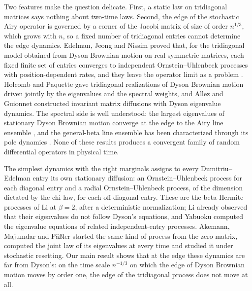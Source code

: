 \documentclass[11pt]{amsart}
\theoremstyle{remark}
\begin{document}
Two features make the question delicate. First, a static law on tridiagonal matrices says nothing about two-time laws.
Second, the edge of the stochastic Airy operator is governed by a corner of the Jacobi matrix of size of order
$n^{1/3}$, which grows with $n$, so a fixed number of tridiagonal entries cannot determine the edge dynamics.
Edelman, Jeong and Nissim \cite[Theorem~3.1]{EJN24} proved that, for the tridiagonal model obtained from Dyson Brownian
motion on real symmetric matrices, each fixed finite set of entries converges to independent Ornstein--Uhlenbeck
processes with position-dependent rates, and they leave the operator limit as a problem \cite[Problem~4]{EJN24}.
Holcomb and Paquette \cite{HP17} gave tridiagonal realizations of Dyson Brownian motion driven jointly by the
eigenvalues and the spectral weights, and Allez and Guionnet \cite{AG13} constructed invariant matrix diffusions with
Dyson eigenvalue dynamics. The spectral side is well understood: the largest eigenvalues of stationary Dyson Brownian motion
converge at the edge to the Airy line ensemble \cite{CH14,Lan20,GXZ24}, and the general-beta line ensemble has been
characterized through its pole dynamics \cite{HZ26}. None of these results produces a convergent family of random
differential operators in physical time.

The simplest dynamics with the right marginals assigns to every Dumitriu--Edelman entry its own stationary diffusion:
an Ornstein--Uhlenbeck process for each diagonal entry and a radial Ornstein--Uhlenbeck process, of the dimension
dictated by the chi law, for each off-diagonal entry. These are the beta-Hermite processes of Li \cite{Li10} at
$\beta=2$, after a deterministic normalization; Li already observed that their eigenvalues do not follow Dyson's
equations, and Yabuoku \cite{Yab23} computed the eigenvalue equations of related independent-entry processes.
Akemann, Majumdar and P\"a{\ss}ler \cite{AMP26} started the same kind of process from the zero matrix, computed the
joint law of its eigenvalues at every time and studied it under stochastic resetting. Our main
result shows that at the edge these dynamics are far from Dyson's: on the time scale $n^{-1/3}$ on which the edge of
Dyson Brownian motion moves by order one, the edge of the tridiagonal process does not move at all.
\end{document}
